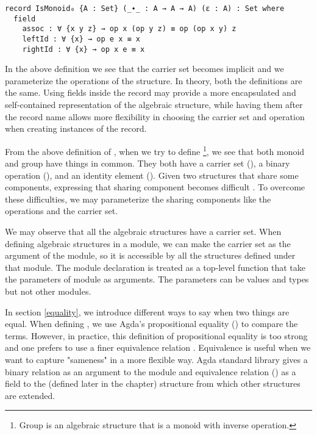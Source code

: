\begin{verbatim}
record IsMonoid₀ {A : Set} (_∙_ : A → A → A) (ε : A) : Set where
  field
    assoc : ∀ {x y z} → op x (op y z) ≡ op (op x y) z
    leftId : ∀ {x} → op e x ≡ x
    rightId : ∀ {x} → op x e ≡ x 
\end{verbatim}

In the above definition we see that the carrier set  becomes implicit
and we parameterize the operations of the structure. In theory, both the
definitions are the same. Using fields inside the record may provide a more
encapsulated and self-contained representation of the algebraic structure, while
having them after the record name allows more flexibility in choosing the
carrier set and operation when creating instances of the record. 

From the above definition of , when we try to define
\footnote{Group is an algebraic structure that is a monoid with
inverse operation.}, we see that both monoid and group have things in common.
They both have a carrier set (), a binary operation (), and
an identity element (). Given two structures that share some
components, expressing that sharing component becomes difficult \cite{musa}. To
overcome these difficulties, we may parameterize the sharing components like the
operations and the carrier set.

We may observe that all the algebraic structures have a carrier set. When
defining algebraic structures in a module, we can make the carrier set as the
argument of the module, so it is accessible by all the structures defined under
that module. The module declaration is treated as a top-level function that take
the parameters of module as arguments. The parameters can be values and types
but not other modules.

In section \ref{equality}, we introduce different ways to say when two things
are equal. When defining , we use Agda's propositional equality
() to compare the terms. However, in practice, this definition of
propositional equality is too strong and one prefers to use a finer equivalence
relation \cite{musa}. Equivalence is useful when we want to capture "sameness"
in a more flexible way. Agda standard library gives a binary relation as an
argument to the module and equivalence relation () as a
field to the  (defined later in the chapter) structure from
which other structures are extended.
 
